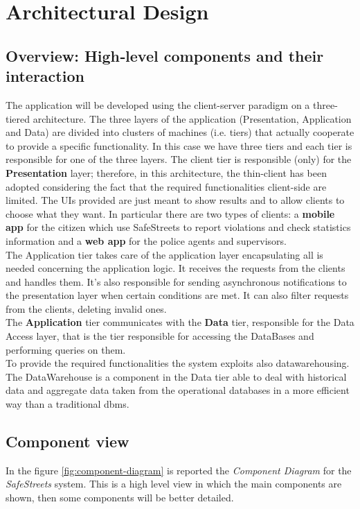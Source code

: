 \documentclass[a4paper]{report}
\begin{document}
\chapter{Architectural Design}
\section{Overview: High­‐level components and their interaction}
The application will be developed using the client-server paradigm on a three-tiered architecture. The three layers of the application (Presentation, Application and Data) are divided into clusters of machines (i.e. tiers) that actually cooperate to provide a specific functionality. In this case we have three tiers  and each tier is responsible for one of the three layers. The client tier is responsible (only) for the \textbf{Presentation} layer; therefore, in this architecture, the thin-client has been adopted considering the fact that the required functionalities client-side are limited. The UIs provided are just meant to show results and to allow clients to choose what they want. In particular there are two types of clients: a \textbf{mobile app} for the citizen which use SafeStreets to report violations and check statistics information and a \textbf{web app} for the police agents and supervisors. \\
The Application tier takes care of the application layer encapsulating all is needed concerning the application logic. It receives the requests from the clients and handles them. It's also responsible for sending asynchronous notifications to the presentation layer when certain conditions are met. It can also filter requests from the clients, deleting invalid ones.\\
The \textbf{Application} tier communicates with the \textbf{Data} tier, responsible for the Data Access layer, that is the tier responsible for accessing the DataBases and performing queries on them.\\
To provide the required functionalities the system exploits also datawarehousing. The DataWarehouse is a component in the Data tier able to deal with historical data and aggregate data taken from the operational databases in a more efficient way than a traditional dbms.
\section{Component view}
In the figure \ref{fig:component-diagram} is reported the \textit{Component Diagram} for the \textit{SafeStreets} system. This is a high level view in which the main components are shown, then some components will be better detailed.
\end{document}

